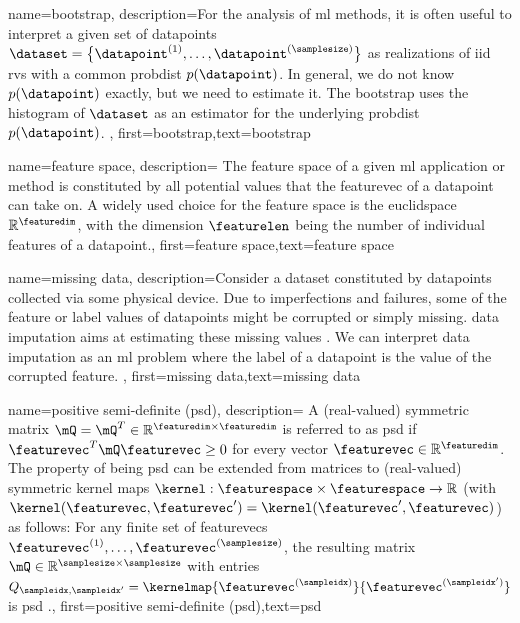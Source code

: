 {{
{name={bootstrap},
	description={For the analysis of \gls{ml} methods, it is often useful to interpret 
		a given set of \gls{datapoint}s $\dataset = \big\{ \datapoint^{(1)},\ldots,\datapoint^{(\samplesize)}\big\}$ 
		as \gls{realization}s of \gls{iid} \gls{rv}s with a common \gls{probdist} $p(\datapoint)$. In general, we 
		do not know $p(\datapoint)$ exactly, but we need to estimate it. The bootstrap uses the 
		histogram of $\dataset$ as an estimator for the underlying \gls{probdist} $p(\datapoint)$. 
	},
	first={bootstrap},text={bootstrap}  
}

{name={feature space},
	description={
		The \gls{feature} space of a given \gls{ml} application or method is 
		constituted by all potential values that the \gls{featurevec} of a \gls{datapoint} can 
		take on. A widely used choice for the \gls{feature} space is the \gls{euclidspace} $\mathbb{R}^{\featuredim}$, 
		with the dimension $\featurelen$ being the number of individual \gls{feature}s of a \gls{datapoint}.},
	first={feature space},text={feature space}  
}


{name={missing data},
	description={Consider a \gls{dataset} constituted by \gls{datapoint}s collected via 
		some physical \gls{device}. Due to imperfections and failures, some of the \gls{feature} 
		or \gls{label} values of \gls{datapoint}s might be corrupted or simply missing. 
		\Gls{data} imputation aims at estimating these missing values \cite{Abayomi2008DiagnosticsFM}. 
		We can interpret \gls{data} imputation as an \gls{ml} problem where the \gls{label} of a \gls{datapoint} is 
		the value of the corrupted \gls{feature}. },
	first={missing data},text={missing data}  
}


{name={positive semi-definite (psd)},
	description=
	{A (real-valued) symmetric matrix $\mQ = \mQ^{T} \in \mathbb{R}^{\featuredim \times \featuredim}$ 
	 is referred to as psd if $\featurevec^{T} \mQ \featurevec \geq 0$ for every vector $\featurevec \in \mathbb{R}^{\featuredim}$. 
	 The property of being psd can be extended from matrices to (real-valued) 
	 symmetric \gls{kernel} maps $\kernel: \featurespace \times \featurespace \rightarrow \mathbb{R}$ 
	 (with $\kernel(\featurevec,\featurevec') = \kernel(\featurevec',\featurevec)$)
	 as follows: For any finite set of \gls{featurevec}s $\featurevec^{(1)},\dots,\featurevec^{(\samplesize)}$, 
	 the resulting matrix $\mQ \in \mathbb{R}^{\samplesize \times \samplesize}$ with 
	entries $Q_{\sampleidx,\sampleidx'} = \kernelmap{\featurevec^{(\sampleidx)}}{\featurevec^{(\sampleidx')}}$ 
	is psd \cite{LearningKernelsBook}.},
	first={positive semi-definite (psd)},text={psd}  
}

}}
